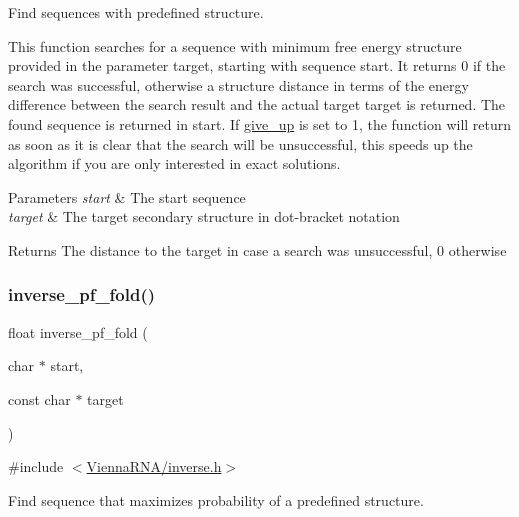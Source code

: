 Find sequences with predefined structure. 

This function searches for a sequence with minimum free energy structure provided in the parameter \textquotesingle{}target\textquotesingle{}, starting with sequence \textquotesingle{}start\textquotesingle{}. It returns 0 if the search was successful, otherwise a structure distance in terms of the energy difference between the search result and the actual target \textquotesingle{}target\textquotesingle{} is returned. The found sequence is returned in \textquotesingle{}start\textquotesingle{}. If \mbox{\hyperlink{group__inverse__fold_ga7ec4ba51f86e1717a1e174264e4a75ce}{give\+\_\+up}} is set to 1, the function will return as soon as it is clear that the search will be unsuccessful, this speeds up the algorithm if you are only interested in exact solutions.


\begin{DoxyParams}{Parameters}
{\em start} & The start sequence \\
\hline
{\em target} & The target secondary structure in dot-\/bracket notation \\
\hline
\end{DoxyParams}
\begin{DoxyReturn}{Returns}
The distance to the target in case a search was unsuccessful, 0 otherwise 
\end{DoxyReturn}
\mbox{\label{group__inverse__fold_gaeef52ecbf2a2450ad585a344f9826806}} 
\subsubsection{\texorpdfstring{inverse\_pf\_fold()}{inverse\_pf\_fold()}}
{\footnotesize\ttfamily float inverse\+\_\+pf\+\_\+fold (\begin{DoxyParamCaption}\item[{char $\ast$}]{start,  }\item[{const char $\ast$}]{target }\end{DoxyParamCaption})}



{\ttfamily \#include $<$\mbox{\hyperlink{inverse_8h}{Vienna\+R\+N\+A/inverse.\+h}}$>$}



Find sequence that maximizes probability of a predefined structure. 

